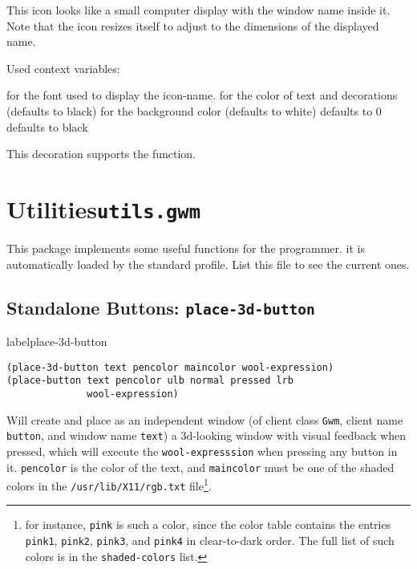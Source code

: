 This icon looks like a small computer display with the window name inside
it. Note that the icon resizes itself to adjust to the dimensions of the
displayed name.

Used context variables:

\begin{description}
 for the font used to display the icon-name.
 for the color of text and decorations (defaults
to black)
 for the background color (defaults
to white)
 defaults to 0
 defaults to black
\end{description}

This decoration supports the  function.

\section{Utilities\hfill{\tt utils.gwm}}
\label{utils}

This package implements some useful functions for the {\WOOL} programmer. it
is automatically loaded by the standard profile.  List this file to see the
current ones.

\subsection{Standalone Buttons: {\tt place-3d-button}}
label{place-3d-button}

{\usagefont\begin{verbatim}
(place-3d-button text pencolor maincolor wool-expression)
(place-button text pencolor ulb normal pressed lrb 
              wool-expression)
\end{verbatim}}\usageupspace

Will create and place as an independent window (of client class \verb|Gwm|,
client name \verb|button|, and window name \verb|text|) a 3d-looking window
with visual feedback when pressed, which will execute the
\verb|wool-expresssion| when pressing any button in it. \verb|pencolor| is the
color of the text, and \verb|maincolor| must be one of the shaded colors in
the \verb|/usr/lib/X11/rgb.txt| file\footnote{for instance, \verb|pink| is
such a color, since the color table contains the entries \verb|pink1|,
\verb|pink2|, \verb|pink3|, and \verb|pink4| in clear-to-dark order. The full
list of such colors is in the \verb|shaded-colors| list.}.

